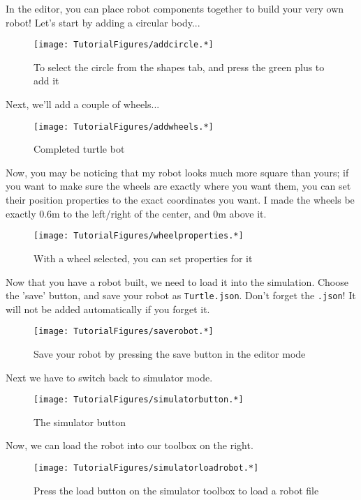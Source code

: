 In the editor, you can place robot components together to build your
very own robot! Let's start by adding a circular body...

\begin{figure}
\centering
\texttt{[image: TutorialFigures/addcircle.*]}
\caption{To select the circle from the shapes tab, and press the green
plus to add it}
\end{figure}

Next, we'll add a couple of wheels...

\begin{figure}
\centering
\texttt{[image: TutorialFigures/addwheels.*]}
\caption{Completed turtle bot}
\end{figure}

Now, you may be noticing that my robot looks much more square than
yours; if you want to make sure the wheels are exactly where you want
them, you can set their position properties to the exact coordinates you
want. I made the wheels be exactly 0.6m to the left/right of the center,
and 0m above it.

\begin{figure}
\centering
\texttt{[image: TutorialFigures/wheelproperties.*]}
\caption{With a wheel selected, you can set properties for it}
\end{figure}

Now that you have a robot built, we need to load it into the simulation.
Choose the 'save' button, and save your robot as \texttt{Turtle.json}.
Don't forget the \texttt{.json}! It will not be added automatically if
you forget it.

\begin{figure}
\centering
\texttt{[image: TutorialFigures/saverobot.*]}
\caption{Save your robot by pressing the save button in the editor mode}
\end{figure}

Next we have to switch back to simulator mode.

\begin{figure}
\centering
\texttt{[image: TutorialFigures/simulatorbutton.*]}
\caption{The simulator button}
\end{figure}

Now, we can load the robot into our toolbox on the right.

\begin{figure}
\centering
\texttt{[image: TutorialFigures/simulatorloadrobot.*]}
\caption{Press the load button on the simulator toolbox to load a robot
file}
\end{figure}

